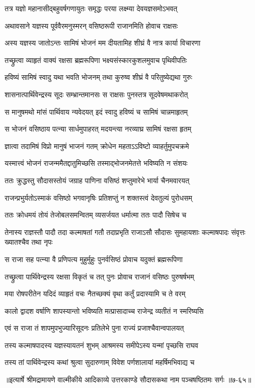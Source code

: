 \twolineshloka
{तत्र यज्ञो महानासीद्बहुवर्षगणायुतः}
{समृद्धः परया लक्ष्म्या देवयज्ञसमोऽभवत्} %

\twolineshloka
{अथावसाने यज्ञस्य पूर्ववैरमनुस्मरन्}
{वसिष्ठरूपी राजानमिति होवाच राक्षसः} %

\twolineshloka
{अस्य यज्ञस्य जातोऽन्तः सामिषं भोजनं मम}
{दीयतामिह शीघ्रं वै नात्र कार्या विचारणा} %

\twolineshloka
{तच्छ्रुत्वा व्याहृतं वाक्यं रक्षसा ब्रह्मरूपिणा}
{भक्ष्यसंस्कारकुशलमुवाच पृथिवीपतिः} %

\twolineshloka
{हविष्यं सामिषं स्वादु यथा भवति भोजनम्}
{तथा कुरुष्व शीघ्रं वै परितुष्येद्यथा गुरुः} %

\twolineshloka
{शासनात्पार्थिवेन्द्रस्य सूदः सम्भ्रान्तमानसः}
{स राक्षसः पुनस्तत्र सूदवेषमथाकरोत्} %

\twolineshloka
{स मानुषमथो मांसं पार्थिवाय न्यवेदयत्}
{इदं स्वादु हविष्यं च सामिषं चान्नमाहृतम्} %

\twolineshloka
{स भोजनं वसिष्ठाय पत्न्या सार्धमुपाहरत्}
{मदयन्त्या नरव्याघ्र सामिषं रक्षसा हृतम्} %

\twolineshloka
{ज्ञात्वा तदामिषं विप्रो मानुषं भाजनं गतम्}
{क्रोधेन महताऽऽविष्टो व्याहर्तुमुपचक्रमे} %

\twolineshloka
{यस्मात्त्वं भोजनं राजन्ममैतद्दातुमिच्छसि}
{तस्माद्भोजनमेतत्ते भविष्यति न संशयः} %

\twolineshloka
{ततः क्रुद्धस्तु सौदासस्तोयं जग्राह पाणिना}
{वसिष्ठं शप्तुमारेभे भार्या चैनमवारयत्} %

\twolineshloka
{राजन्प्रभुर्यतोऽस्माकं वसिष्ठो भगवानृषिः}
{प्रतिशप्तुं न शक्तस्त्वं देवतुल्यं पुरोधसम्} %

\twolineshloka
{ततः क्रोधमयं तोयं तेजोबलसमन्वितम्}
{व्यसर्जयत धर्मात्मा ततः पादौ सिषेच च} %

\threelineshloka
{तेनास्य राज्ञस्तौ पादौ तदा कल्माषतां गतौ}
{तदाप्रभृति राजाऽसौ सौदासः सुमहायशाः}
{कल्माषपादः संवृत्तः ख्यातश्चैव तथा नृपः} %

\twolineshloka
{स राजा सह पत्न्या वै प्रणिपत्य मुहुर्मुहुः}
{पुनर्वसिष्ठं प्रोवाच यदुक्तं ब्रह्मरूपिणा} %

\twolineshloka
{तच्छ्रुत्वा पार्थिवेन्द्रस्य रक्षसा विकृतं च तत्}
{पुनः प्रोवाच राजानं वसिष्ठः पुरुषर्षभम्} %

\twolineshloka
{मया रोषपरीतेन यदिदं व्याहृतं वचः}
{नैतच्छक्यं वृथा कर्तुं प्रदास्यामि च ते वरम्} %

\twolineshloka
{कालो द्वादश वर्षाणि शापस्यान्तो भविष्यति}
{मत्प्रासादाच्च राजेन्द्र व्यतीतं न स्मरिष्यसि} %

\twolineshloka
{एवं स राजा तं शापमुपभुज्यारिसूदनः}
{प्रतिलेभे पुना राज्यं प्रजाश्चैवान्वपालयत्} %

\twolineshloka
{तस्य कल्माषपादस्य यज्ञस्यायतनं शुभम्}
{आश्रमस्य समीपेऽस्य यन्मां पृच्छसि राघव} %

\twolineshloka
{तस्य तां पार्थिवेन्द्रस्य कथां श्रुत्वा सुदारुणाम्}
{विवेश पर्णशालायां महर्षिमभिवाद्य च} %


॥इत्यार्षे श्रीमद्रामायणे वाल्मीकीये आदिकाव्ये उत्तरकाण्डे सौदासकथा नाम पञ्चषष्ठितमः सर्गः ॥७-६५॥

